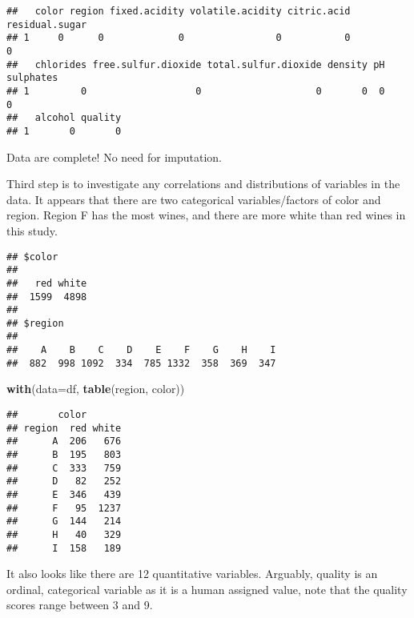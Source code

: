 \documentclass[
]{article}
\newenvironment{Shaded}{\begin{snugshade}}{\end{snugshade}}
\newcommand{\DataTypeTok}[1]{\textcolor[rgb]{0.13,0.29,0.53}{#1}}
\newcommand{\KeywordTok}[1]{\textcolor[rgb]{0.13,0.29,0.53}{\textbf{#1}}}
\newcommand{\NormalTok}[1]{#1}
\newcommand{\OperatorTok}[1]{\textcolor[rgb]{0.81,0.36,0.00}{\textbf{#1}}}
\begin{document}
\begin{verbatim}
##   color region fixed.acidity volatile.acidity citric.acid residual.sugar
## 1     0      0             0                0           0              0
##   chlorides free.sulfur.dioxide total.sulfur.dioxide density pH sulphates
## 1         0                   0                    0       0  0         0
##   alcohol quality
## 1       0       0
\end{verbatim}

Data are complete! No need for imputation.

Third step is to investigate any correlations and distributions of
variables in the data. It appears that there are two categorical
variables/factors of color and region. Region F has the most wines, and
there are more white than red wines in this study.

\begin{Shaded}
\end{Shaded}

\begin{verbatim}
## $color
## 
##   red white 
##  1599  4898 
## 
## $region
## 
##    A    B    C    D    E    F    G    H    I 
##  882  998 1092  334  785 1332  358  369  347
\end{verbatim}

\begin{Shaded}
\begin{Highlighting}[]
\KeywordTok{with}\NormalTok{(}\DataTypeTok{data=}\NormalTok{df, }\KeywordTok{table}\NormalTok{(region, color))}
\end{Highlighting}
\end{Shaded}

\begin{verbatim}
##       color
## region  red white
##      A  206   676
##      B  195   803
##      C  333   759
##      D   82   252
##      E  346   439
##      F   95  1237
##      G  144   214
##      H   40   329
##      I  158   189
\end{verbatim}

It also looks like there are 12 quantitative variables. Arguably,
quality is an ordinal, categorical variable as it is a human assigned
value, note that the quality scores range between 3 and 9.

\begin{Shaded}
\end{Shaded}
\end{document}
